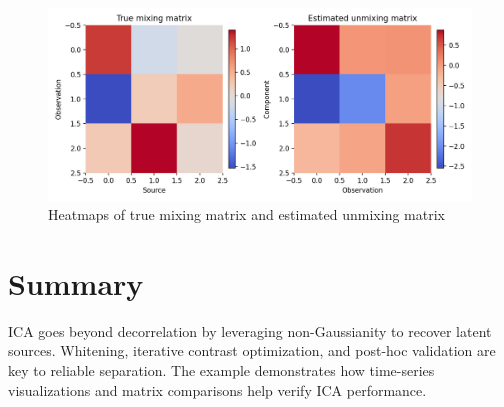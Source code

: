 ﻿\documentclass[12pt]{article}
\begin{document}
\begin{figure}[H]
  \centering
  \includegraphics[width=0.75\linewidth]{ica_mixing_matrices.png}
  \caption{Heatmaps of true mixing matrix and estimated unmixing matrix}
  \label{fig:ica_mixing_matrices}
\end{figure}

\FloatBarrier
\section{Summary}
ICA goes beyond decorrelation by leveraging non-Gaussianity to recover latent sources. Whitening, iterative contrast optimization, and post-hoc validation are key to reliable separation. The example demonstrates how time-series visualizations and matrix comparisons help verify ICA performance.
\end{document}
